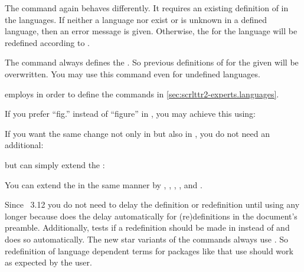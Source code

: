 The command  again behaves differently. It requires an
existing definition of  in the languages.  If neither
a language nor  exist or  is unknown in a
defined language, then an error message is given. Otherwise, the
 for the language will be redefined according to
.

The command  always
defines the . So previous definitions of  for the
given  will be overwritten. You may use this command even for
undefined languages.

\KOMAScript{} employs  in order to define the
commands in \autoref{sec:scrlttr2-experts.languages}.

\begin{Example}
  If you prefer ``fig.'' instead of ``figure'' in , you may
  achieve this using:
\begin{lstcode}
\end{lstcode}
  If you want the same change not only in  but also in
  , you do not need an additional:
\begin{lstcode}
\end{lstcode}
  but can simply extend the :
\begin{lstcode}
\end{lstcode}
  You can extend the  in the same manner by
  , , , ,
  and .
\end{Example}
  
Since \KOMAScript~3.12 you do not need to
delay the definition or redefinition until 
using  any longer because  does the
delay automatically for (re)definitions in the document's
preamble. Additionally,  tests if a redefinition should be
made in  instead of
 and does so automatically. The new star
variants of the commands always use . So
redefinition of language dependent terms for packages like 
that use  should work as expected by the user.

